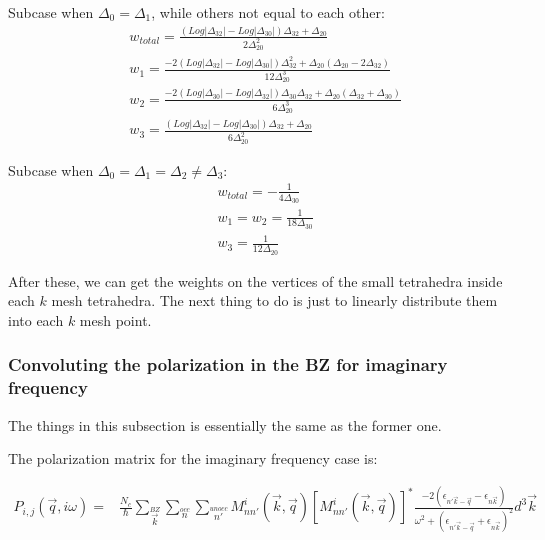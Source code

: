 \documentclass[10pt]{article}
\begin{document}
Subcase when $\Delta_0=\Delta_1$, while others not equal to each other:\\

\begin{subequations}\label{wtt14}
\begin{align}
&w_{total}=\frac{(Log|\Delta_{32}|-Log|\Delta_{30}|)\Delta_{32}+\Delta_{20}}{2\Delta_{20}^2}\\
&w_{1}=\frac{-2(Log|\Delta_{32}|-Log|\Delta_{30}|)\Delta_{32}^2+\Delta_{20}(\Delta_{20}-2\Delta_{32})}{12\Delta_{20}^3}\\
&w_{2}=\frac{-2(Log|\Delta_{30}|-Log|\Delta_{32}|)\Delta_{30}\Delta_{32}+\Delta_{20}(\Delta_{32}+\Delta_{30})}{6\Delta_{20}^3}\\
&w_{3}=\frac{(Log|\Delta_{32}|-Log|\Delta_{30}|)\Delta_{32}+\Delta_{20}}{6\Delta_{20}^2}
\end{align}
\end{subequations}

Subcase when $\Delta_0=\Delta_1=\Delta_2\neq\Delta_3$:\\

\begin{subequations}\label{wtt15}
\begin{align}
&w_{total}=-\frac{1}{4\Delta_{30}}\\
&w_{1}=w_2=\frac{1}{18\Delta_{30}}\\
&w_3=\frac{1}{12\Delta_{20}}
\end{align}
\end{subequations}


After these, we can get the weights on the vertices of the small tetrahedra inside each $k$ mesh tetrahedra. The next thing to do is just to linearly distribute them into each $k$ mesh point. 


\subsubsection{Convoluting the polarization in the BZ for imaginary frequency}

The things in this subsection is essentially the same as the former one. 

The polarization matrix for the imaginary frequency case is:

\begin{eqnarray} 
P_{i,j}(\vec{q},i\omega)=&\frac{N_c}{\hbar}\sum\limits_{\vec{k}}\limits^{BZ}\sum\limits_{n}\limits^{occ}\sum\limits_{n'}\limits^{unocc}M_{nn'}^{i}(\vec{k},\vec{q})[M_{nn'}^{i}(\vec{k},\vec{q})]^{*}\frac{-2(\epsilon_{n'\vec{k}-\vec{q}}-\epsilon_{n\vec{k}})}{\omega^2+(\epsilon_{n'\vec{k}-\vec{q}}+\epsilon_{n\vec{k}})^2}d^3\vec{k}
\label{polarmatimag}
\end{eqnarray}
\end{document}
